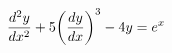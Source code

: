 \documentclass[preview]{standalone}
\begin{document}
\begin{align*}
\special{dvisvgm:raw <g id='unique000'>}\dfrac{d^2y}{dx^2} + 5\!\left(\dfrac{dy}{dx}\right)^{3} - 4y = e^x\special{dvisvgm:raw </g>}
\end{align*}
\end{document}
